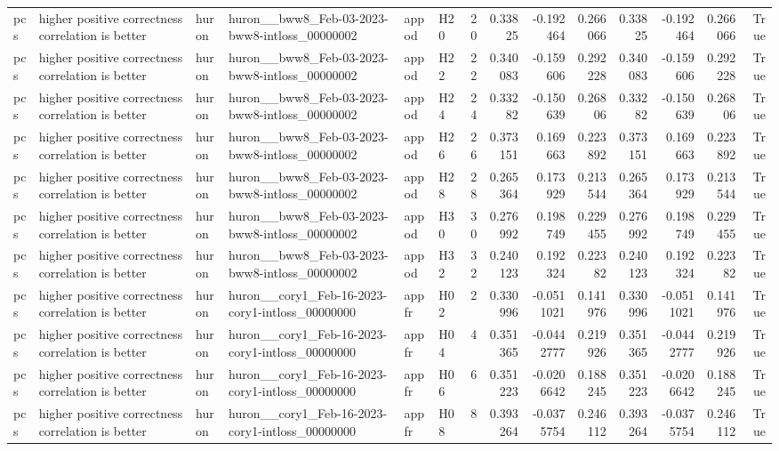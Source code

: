 \begin{longtable}{llllllrrrrrrrr}
pcs & higher positive correctness correlation is better & huron & huron\_\_bww8\_Feb-03-2023-bww8-intloss\_00000002 & appod & H20 & 20 & 0.33825 & -0.192464 & 0.266066 & 0.33825 & -0.192464 & 0.266066 & True \\
pcs & higher positive correctness correlation is better & huron & huron\_\_bww8\_Feb-03-2023-bww8-intloss\_00000002 & appod & H22 & 22 & 0.340083 & -0.159606 & 0.292228 & 0.340083 & -0.159606 & 0.292228 & True \\
pcs & higher positive correctness correlation is better & huron & huron\_\_bww8\_Feb-03-2023-bww8-intloss\_00000002 & appod & H24 & 24 & 0.33282 & -0.150639 & 0.26806 & 0.33282 & -0.150639 & 0.26806 & True \\
pcs & higher positive correctness correlation is better & huron & huron\_\_bww8\_Feb-03-2023-bww8-intloss\_00000002 & appod & H26 & 26 & 0.373151 & 0.169663 & 0.223892 & 0.373151 & 0.169663 & 0.223892 & True \\
pcs & higher positive correctness correlation is better & huron & huron\_\_bww8\_Feb-03-2023-bww8-intloss\_00000002 & appod & H28 & 28 & 0.265364 & 0.173929 & 0.213544 & 0.265364 & 0.173929 & 0.213544 & True \\
pcs & higher positive correctness correlation is better & huron & huron\_\_bww8\_Feb-03-2023-bww8-intloss\_00000002 & appod & H30 & 30 & 0.276992 & 0.198749 & 0.229455 & 0.276992 & 0.198749 & 0.229455 & True \\
pcs & higher positive correctness correlation is better & huron & huron\_\_bww8\_Feb-03-2023-bww8-intloss\_00000002 & appod & H32 & 32 & 0.240123 & 0.192324 & 0.22382 & 0.240123 & 0.192324 & 0.22382 & True \\
pcs & higher positive correctness correlation is better & huron & huron\_\_cory1\_Feb-16-2023-cory1-intloss\_00000000 & appfr & H02 & 2 & 0.330996 & -0.0511021 & 0.141976 & 0.330996 & -0.0511021 & 0.141976 & True \\
pcs & higher positive correctness correlation is better & huron & huron\_\_cory1\_Feb-16-2023-cory1-intloss\_00000000 & appfr & H04 & 4 & 0.351365 & -0.0442777 & 0.219926 & 0.351365 & -0.0442777 & 0.219926 & True \\
pcs & higher positive correctness correlation is better & huron & huron\_\_cory1\_Feb-16-2023-cory1-intloss\_00000000 & appfr & H06 & 6 & 0.351223 & -0.0206642 & 0.188245 & 0.351223 & -0.0206642 & 0.188245 & True \\
pcs & higher positive correctness correlation is better & huron & huron\_\_cory1\_Feb-16-2023-cory1-intloss\_00000000 & appfr & H08 & 8 & 0.393264 & -0.0375754 & 0.246112 & 0.393264 & -0.0375754 & 0.246112 & True \\

\end{longtable}

